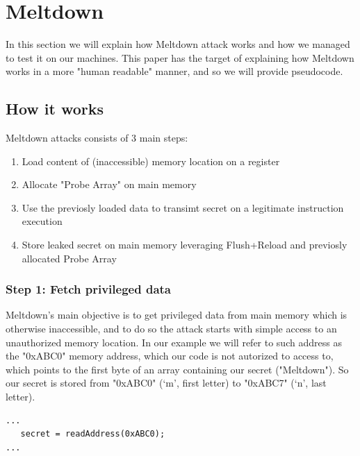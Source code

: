\section{Meltdown}
In this section we will explain how Meltdown attack works and how we managed to
test it on our machines. This paper has the target of explaining how Meltdown works in a more "human readable" manner, and so we will provide pseudocode.

\subsection{How it works}
Meltdown attacks consists of 3 main steps:

\begin{enumerate}[label={Step \arabic*:}]
    \item Load content of (inaccessible) memory location on a register
    \item Allocate "Probe Array" on main memory
    \item Use the previosly loaded data to transimt secret on a legitimate instruction execution
    \item Store leaked secret on main memory leveraging Flush+Reload and previosly allocated Probe Array
\end{enumerate}


\subsubsection{Step 1: Fetch privileged data}
Meltdown's main objective is to get privileged data from main memory which is otherwise inaccessible, and to do so
the attack starts with simple access to an unauthorized memory location.
In our example we will refer to such address as the "0xABC0" memory address, which our code is not autorized to access to,
which points to the first byte of an array containing our secret ("Meltdown").
So our secret is stored from "0xABC0" (`m', first letter) to "0xABC7" (`n', last letter).

\begin{Verbatim}[fontsize=\small]
...
   secret = readAddress(0xABC0);
...
\end{Verbatim}

